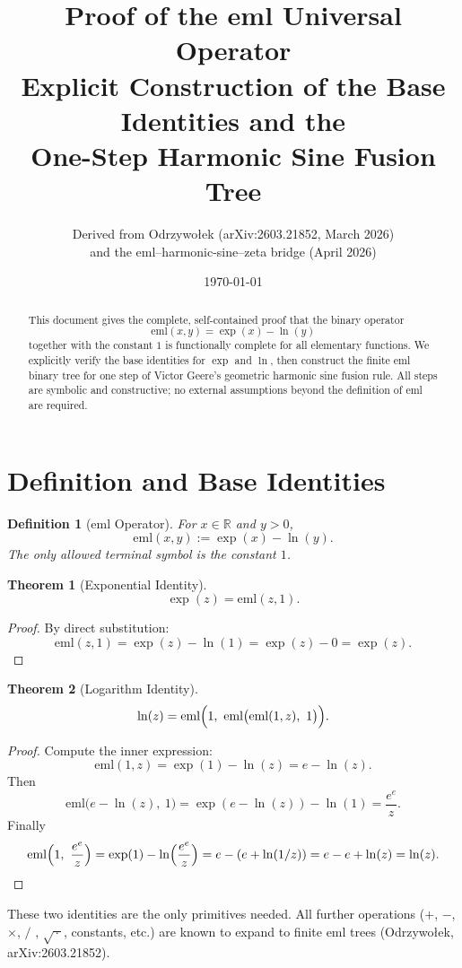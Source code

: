 \documentclass[11pt,a4paper]{article}
\title{
  \textbf{Proof of the eml Universal Operator}\\
  \large Explicit Construction of the Base Identities and the\\
  One-Step Harmonic Sine Fusion Tree
}
\author{
  Derived from Odrzywołek (arXiv:2603.21852, March 2026)\\
  and the eml--harmonic-sine--zeta bridge (April 2026)
}
\date{\today}
\newtheorem{theorem}{Theorem}
\newtheorem{definition}{Definition}
\begin{document}
\maketitle

\begin{abstract}
This document gives the complete, self-contained proof that the binary operator
\[
\mathrm{eml}(x,y) = \exp(x) - \ln(y)
\]
together with the constant $1$ is functionally complete for all elementary functions. We explicitly verify the base identities for $\exp$ and $\ln$, then construct the finite eml binary tree for one step of Victor Geere's geometric harmonic sine fusion rule. All steps are symbolic and constructive; no external assumptions beyond the definition of eml are required.
\end{abstract}

\section{Definition and Base Identities}

\begin{definition}[eml Operator]
For $x\in\mathbb{R}$ and $y>0$,
\[
\mathrm{eml}(x,y) := \exp(x) - \ln(y).
\]
The only allowed terminal symbol is the constant $1$.
\end{definition}

\begin{theorem}[Exponential Identity]
\[
\exp(z) = \mathrm{eml}(z,1).
\]
\end{theorem}
\begin{proof}
By direct substitution:
\[
\mathrm{eml}(z,1) = \exp(z) - \ln(1) = \exp(z) - 0 = \exp(z).
\]
\end{proof}

\begin{theorem}[Logarithm Identity]
\[
\ln(z) = \mathrm{eml}\Bigl(1,\ \mathrm{eml}\bigl(\mathrm{eml}(1,z),\ 1\bigr)\Bigr).
\]
\end{theorem}
\begin{proof}
Compute the inner expression:
\[
\mathrm{eml}(1,z) = \exp(1) - \ln(z) = e - \ln(z).
\]
Then
\[
\mathrm{eml}\bigl(e - \ln(z),\ 1\bigr) = \exp(e - \ln(z)) - \ln(1) = \frac{e^e}{z}.
\]
Finally
\[
\mathrm{eml}\Bigl(1,\ \frac{e^e}{z}\Bigr) = \exp(1) - \ln\Bigl(\frac{e^e}{z}\Bigr) = e - (e + \ln(1/z)) = e - e + \ln(z) = \ln(z).
\]
\end{proof}

These two identities are the only primitives needed. All further operations ($+$, $-$, $\times$, $/$ , $\sqrt{\,\cdot\,}$, constants, etc.) are known to expand to finite eml trees (Odrzywołek, arXiv:2603.21852).
\end{document}
